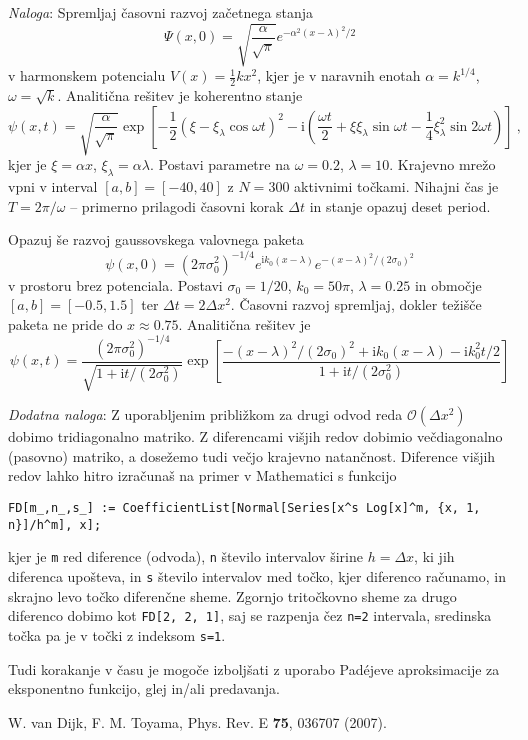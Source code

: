 \documentclass[slovene,11pt,a4paper]{article}
\newcommand{\ii}{\mathrm{i}}
\begin{document}
{\it Naloga\/}: Spremljaj časovni razvoj začetnega stanja
\begin{equation*}
  \Psi(x,0)=\sqrt{\frac{\alpha}{\sqrt{\pi}}} e^{-\alpha^2 (x-\lambda)^2/2}
\end{equation*}
v harmonskem potencialu $V(x)=\frac12 kx^2$, kjer je v naravnih enotah $\alpha=k^{1/4}$, $\omega=\sqrt{k}$. Analitična rešitev je koherentno stanje
\begin{equation*}
  \psi(x,t)=\sqrt{\frac{\alpha}{\sqrt{\pi}}} \exp\left[-\frac12 \left(\xi-\xi_\lambda \cos\omega t\right)^2 - \ii \left(\frac{\omega t}{2}+\xi\xi_\lambda \sin\omega t - \frac14 \xi_\lambda^2 \sin 2 \omega t\right)\right]\>,
\end{equation*}
kjer je $\xi=\alpha x$, $\xi_\lambda=\alpha \lambda$. Postavi parametre na $\omega=0.2$, $\lambda=10$. Krajevno mrežo vpni v interval $[a,b]=[-40,40]$ z $N=300$ aktivnimi točkami. Nihajni čas je $T=2\pi/\omega$ -- primerno prilagodi časovni korak $\Delta t$ in stanje opazuj deset period.

Opazuj še razvoj gaussovskega valovnega paketa
\begin{equation*}
  \psi(x,0)=(2\pi \sigma_0^2)^{-1/4} e^{\ii k_0(x-\lambda)}e^{-(x-\lambda)^2/(2\sigma_0)^2}
\end{equation*}
v prostoru brez potenciala. Postavi $\sigma_0=1/20$, $k_0=50\pi$, $\lambda=0.25$ in območje $[a,b]=[-0.5,1.5]$ ter $\Delta t=2\Delta x^2$. Časovni razvoj spremljaj, dokler težišče paketa ne pride do $x\approx 0.75$. Analitična rešitev je
\begin{equation*}
  \psi(x,t)=\frac{(2\pi \sigma_0^2)^{-1/4}}{\sqrt{1+\ii t/(2\sigma_0^2)}} \exp\left[
    \frac{-(x-\lambda)^2/(2\sigma_0)^2+\ii k_0(x-\lambda)-\ii k_0^2 t/2}{1+\ii t/(2\sigma_0^2)}
    \right]
\end{equation*}

{\it Dodatna naloga\/}: Z uporabljenim približkom za drugi odvod reda $\mathcal{O}(\Delta x^2)$ dobimo tridiagonalno matriko. Z diferencami višjih redov dobimio večdiagonalno (pasovno) matriko, a dosežemo tudi večjo krajevno natančnost. Diference višjih redov lahko hitro izračunaš na primer v Mathematici s funkcijo
\begin{center}
  \tt FD[m_,n_,s_] := CoefficientList[Normal[Series[x\string^s Log[x]\string^m, \{x, 1, n\}]/h\string^m], x];
\end{center}
kjer je {\tt m} red diference (odvoda), {\tt n} število intervalov širine $h=\Delta x$, ki jih diferenca upošteva, in {\tt s} število intervalov med točko, kjer diferenco računamo, in skrajno levo točko diferenčne sheme. Zgornjo tritočkovno sheme za drugo diferenco dobimo kot {\tt FD[2, 2, 1]}, saj se razpenja čez {\tt n=2} intervala, sredinska točka pa je v točki z indeksom {\tt s=1}. 

Tudi korakanje v času je mogoče izboljšati z uporabo Pad\'ejeve aproksimacije za eksponentno funkcijo, glej \cite{dijk} in/ali predavanja. 

\begin{thebibliography}{99}
\setlength{\itemsep}{.2\itemsep}\setlength{\parsep}{.5\parsep}
 W. van Dijk, F. M. Toyama, Phys. Rev. E {\bf 75}, 036707 (2007).
\end{thebibliography}
\end{document}
